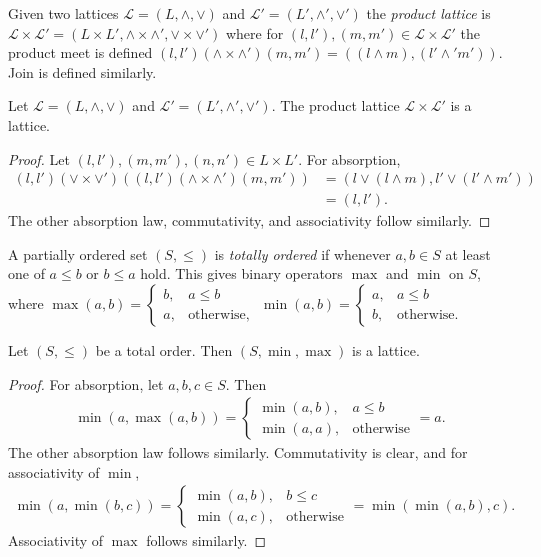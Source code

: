 \begin{definition}
  Given two lattices $\mathcal{L} = (L, \wedge, \vee)$ and $\mathcal{L'} = (L', \wedge', \vee')$ the \emph{product lattice} 
  is $\mathcal{L} \times \mathcal{L'} = (L \times L', \wedge \times \wedge', \vee \times \vee')$ where for $(l, l'), (m, m') \in \mathcal{L} \times \mathcal{L'}$
  the product meet is defined $(l, l') (\wedge \times \wedge') (m, m') = ((l \wedge m), (l' \wedge' m'))$. Join is defined similarly.
\end{definition}
\begin{prop}
  Let $\mathcal{L} = (L, \wedge, \vee)$ and $\mathcal{L'} = (L', \wedge', \vee')$. The product lattice $\mathcal{L} \times \mathcal{L'}$ is a lattice.
\end{prop}
\begin{proof}
  Let $(l, l'), (m, m'), (n, n') \in L \times L'$. For absorption, 
  \begin{align*}
    (l, l') (\vee \times \vee') ((l, l') (\wedge \times \wedge') (m, m')) &= (l \vee (l \wedge m), l' \vee (l' \wedge m')) \\
                                                                          &= (l, l').
  \end{align*}
  The other absorption law, commutativity, and associativity follow similarly.
\end{proof}
\begin{definition}
  A partially ordered set $(S, \leq)$ is \emph{totally ordered} if whenever $a, b \in S$ at least one of $a \leq b$ or $b \leq a$ hold.
  This gives binary operators $\max$ and $\min$ on $S$, where $\max (a, b) = \begin{cases} b, & a \leq b \\ a, & \text{otherwise,}  \end{cases}$
    $\min (a, b) = \begin{cases} a, & a \leq b \\ b, & \text{otherwise.}  \end{cases}$
\end{definition}
\begin{prop}
  Let $(S, \leq)$ be a total order. Then $(S, \min, \max)$ is a lattice.
\end{prop}
\begin{proof}
  For absorption, let $a, b, c \in S$. Then 
  \begin{align*}
    \min(a, \max(a, b)) = \begin{cases} \min(a, b), & a \leq b \\ \min(a, a), & \text{otherwise}\end{cases} = a.
  \end{align*}
  The other absorption law follows similarly. Commutativity is clear, and for associativity of $\min$,
  \begin{align*}
    \min(a, \min(b, c)) = \begin{cases} \min(a, b), &  b \leq c \\ \min(a, c), & \text{otherwise}\end{cases} = \min(\min(a, b), c).
  \end{align*}
  Associativity of $\max$ follows similarly.
\end{proof}
